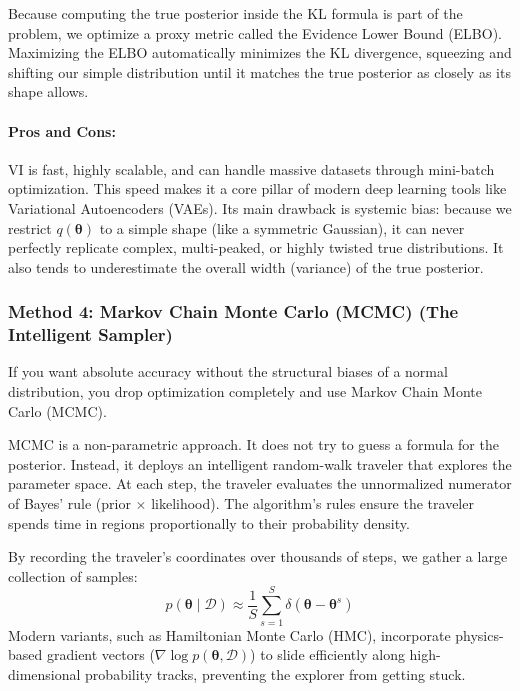 \documentclass{article}
\begin{document}
Because computing the true posterior inside the KL formula is part of the problem, we optimize a proxy metric called the Evidence Lower Bound (ELBO). Maximizing the ELBO automatically minimizes the KL divergence, squeezing and shifting our simple distribution until it matches the true posterior as closely as its shape allows.



\paragraph{Pros and Cons:}
VI is fast, highly scalable, and can handle massive datasets through mini-batch optimization. This speed makes it a core pillar of modern deep learning tools like Variational Autoencoders (VAEs). Its main drawback is systemic bias: because we restrict $q(\boldsymbol{\theta})$ to a simple shape (like a symmetric Gaussian), it can never perfectly replicate complex, multi-peaked, or highly twisted true distributions. It also tends to underestimate the overall width (variance) of the true posterior.

\subsubsection{Method 4: Markov Chain Monte Carlo (MCMC) (The Intelligent Sampler)}
If you want absolute accuracy without the structural biases of a normal distribution, you drop optimization completely and use Markov Chain Monte Carlo (MCMC). 

MCMC is a non-parametric approach. It does not try to guess a formula for the posterior. Instead, it deploys an intelligent random-walk traveler that explores the parameter space. At each step, the traveler evaluates the unnormalized numerator of Bayes' rule (prior $\times$ likelihood). The algorithm's rules ensure the traveler spends time in regions proportionally to their probability density.

By recording the traveler's coordinates over thousands of steps, we gather a large collection of samples:
\begin{equation}
p(\boldsymbol{\theta} \mid \mathcal{D}) \approx \frac{1}{S} \sum_{s=1}^{S} \delta(\boldsymbol{\theta} - \boldsymbol{\theta}^s)
\end{equation}
Modern variants, such as Hamiltonian Monte Carlo (HMC), incorporate physics-based gradient vectors ($\nabla \log p(\boldsymbol{\theta}, \mathcal{D})$) to slide efficiently along high-dimensional probability tracks, preventing the explorer from getting stuck.
\end{document}
